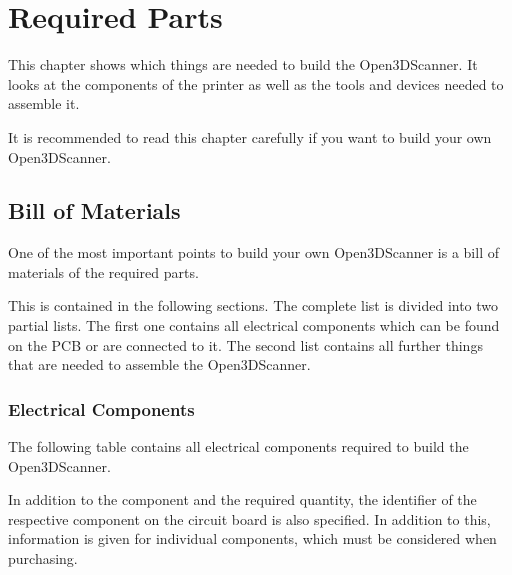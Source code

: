 \chapter{Required Parts}%
\label{c:bom}%
This chapter shows which things are needed to build the Open3DScanner. It looks at the components of the printer as well as the tools and devices needed to assemble it.%

It is recommended to read this chapter carefully if you want to build your own Open3DScanner.%

\section{Bill of Materials}%
One of the most important points to build your own Open3DScanner is a bill of materials of the required parts.%

This is contained in the following sections. The complete list is divided into two partial lists. The first one contains all electrical components which can be found on the PCB or are connected to it. The second list contains all further things that are needed to assemble the Open3DScanner.%

\subsection{Electrical Components}%
The following table contains all electrical components required to build the Open3DScanner.%

In addition to the component and the required quantity, the identifier of the respective component on the circuit board is also specified. In addition to this, information is given for individual components, which must be considered when purchasing.%

